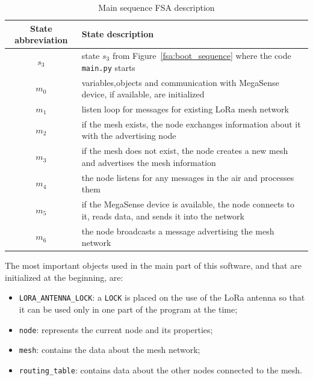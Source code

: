 				\begin{table}[h]
					\renewcommand{\arraystretch}{1.4}
					\begin{center}
						\begin{tabular}{|c|m{10.2cm}|} 
							\hline
							\textbf{State abbreviation} & \textbf{State description} \\\hline
							$s_{3}$ & state $s_{3}$ from Figure~\ref{fsa:boot_sequence} where the code \texttt{main.py} starts\\\hline
							$m_{0}$ & variables,objects and communication with MegaSense device, if available, are initialized\\\hline
							$m_{1}$ & listen loop for messages for existing LoRa mesh network\\\hline
							$m_{2}$ & if the mesh exists, the node exchanges information about it with the advertising node\\\hline
							$m_{3}$ & if the mesh does not exist, the node creates a new mesh and advertises the mesh information\\\hline
							$m_{4}$ & the node listens for any messages in the air and processes them\\\hline
							$m_{5}$ & if the MegaSense device is available, the node connects to it, reads data, and sends it into the network\\\hline
							$m_{6}$ & the node broadcasts a message advertising the mesh network\\\hline
						\end{tabular}
						\caption{Main sequence FSA description}
						\label{table:fsa_main}
					\end{center}
				\end{table}
			
				The most important objects used in the main part of this software, and that are initialized at the beginning, are:
				\begin{itemize}
					\item \texttt{LORA\_ANTENNA\_LOCK}: a \texttt{LOCK} is placed on the use of the LoRa antenna so that it can be used only in one part of the program at the time; 
				    \item \texttt{node}: represents the current node and its properties;
					\item \texttt{mesh}: contains the data about the mesh network;
					\item \texttt{routing\_table}: contains data about the other nodes connected to the mesh.
				\end{itemize}
			
